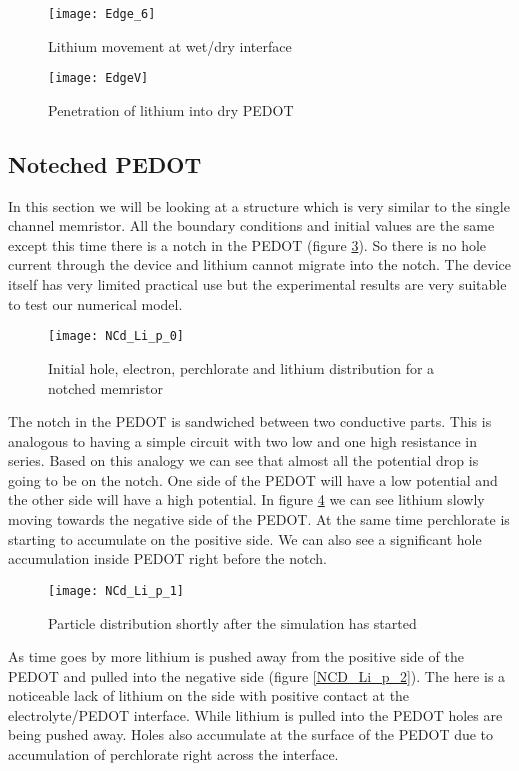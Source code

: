 \begin{figure}[!htp]
\centering
\texttt{[image: Edge\_6]}
\caption{Lithium movement at wet/dry interface} 
\label{Edge_6}
\end{figure}

\begin{figure}[!htp]
\centering
\texttt{[image: EdgeV]}
\caption{Penetration of lithium into dry PEDOT} 
\label{EdgeV}
\end{figure}

\clearpage
\subsection{Noteched PEDOT}

In this section we will be looking at a structure which is very similar to the single channel memristor. All the boundary conditions and initial values are the same except this time there is a notch in the PEDOT (figure \ref{NCd_Li_p_0}). So there is no hole current through the device and lithium cannot migrate into the notch. The device itself has very limited practical use but the experimental results are very suitable to test our numerical model. 

\begin{figure}[!htp]
\centering
\texttt{[image: NCd\_Li\_p\_0]}
\caption{Initial hole, electron, perchlorate and lithium distribution for a notched memristor} 
\label{NCd_Li_p_0}
\end{figure}

The notch in the PEDOT is sandwiched between two conductive parts. This is analogous to having a simple circuit with two low and one high resistance in series. Based on this analogy we can see that almost all the potential drop is going to be on the notch. One side of the PEDOT will have a low potential and the other side will have a high potential. In figure \ref{NCD_Li_p_1} we can see lithium slowly moving towards the negative side of the PEDOT. At the same time perchlorate is starting to accumulate on the positive side. We can also see a significant hole accumulation inside PEDOT right before the notch. 

\begin{figure}[!htp]
\centering
\texttt{[image: NCd\_Li\_p\_1]}
\caption{Particle distribution shortly after the simulation has started} 
\label{NCD_Li_p_1}
\end{figure}

As time goes by more lithium is pushed away from the positive side of the PEDOT and pulled into the negative side (figure \ref{NCD_Li_p_2}). The here is a noticeable lack of lithium on the side with positive contact at the electrolyte/PEDOT interface. While lithium is pulled into the PEDOT holes are being pushed away. Holes also accumulate at the surface of the PEDOT due to accumulation of perchlorate right across the interface.

